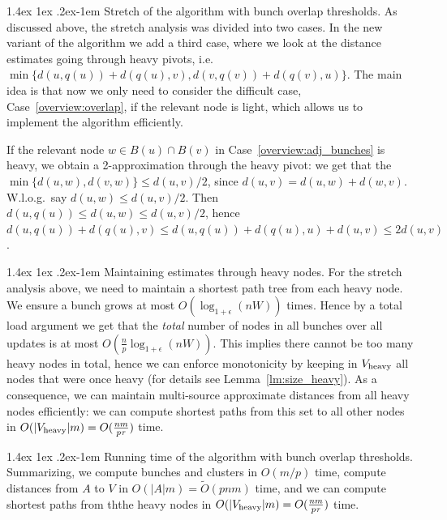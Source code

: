 \documentclass[11pt]{article}
\makeatletter
\theoremstyle{definition}
\theoremstyle{remark}
\renewcommand{\paragraph}{%
  \@startsection{paragraph}{4}%
  {\z@}{1.4ex \@plus 1ex \@minus .2ex}{-1em}%
  {\normalfont\normalsize\bfseries}%
}
\makeatother
\begin{document}
\begin{titlepage}
\paragraph{Stretch of the algorithm with bunch overlap thresholds.} As discussed above, the stretch analysis was divided into two cases. In the new variant of the algorithm we add a third case, where we look at the distance estimates going through heavy pivots, i.e.~$\min \{ d(u,q(u))+d(q(u),v), d(v,q(v))+d(q(v),u)\}$. The main idea is that now we only need to consider the difficult case, Case~\ref{overview:overlap}, if the relevant node is light, which allows us to implement the algorithm efficiently. 

If the relevant node $w\in B(u)\cap B(v)$ in Case~\ref{overview:adj_bunches} is heavy, we obtain a 2-approximation through the heavy pivot: we get that the $\min\{d(u,w),d(v,w)\} \leq d(u,v)/2$, since $d(u,v)= d(u,w)+d(w,v)$. W.l.o.g.\ say $d(u,w)\leq d(u,v)/2$. Then $d(u,q(u))\leq d(u,w)\leq d(u,v)/2$, hence $d(u,q(u))+d(q(u),v)\leq d(u,q(u))+d(q(u),u)+d(u,v) \leq 2d(u,v)$. 

\paragraph{Maintaining estimates through heavy nodes.}
For the stretch analysis above, we need to maintain a shortest path tree from each heavy node. We ensure a bunch grows at most $O(\log_{1+\epsilon}(nW))$ times. Hence by a total load argument we get that the \emph{total} number of nodes in all bunches over all updates is at most $O(\tfrac{n}{p}\log_{1+\epsilon}(nW))$. This implies there cannot be too many heavy nodes in total, hence we can enforce monotonicity by keeping in $V_{\rm{heavy}}$ all nodes that were once heavy (for details see Lemma~\ref{lm:size_heavy}). As a consequence, we can maintain multi-source approximate distances from all heavy nodes efficiently: we can compute shortest paths from this set to all other nodes in $O(|V_{\rm{heavy}}|m)=O(\tfrac{nm}{p\tau})$ time.


\paragraph{Running time of the algorithm with bunch overlap thresholds.}
Summarizing, we compute bunches and clusters in $O(m/p)$ time, compute distances from $A$ to $V$ in $O(|A|m)=\tilde O(pnm)$ time, and we can compute shortest paths from ththe heavy nodes in $O(|V_{\rm{heavy}}|m)=O(\tfrac{nm}{p\tau})$ time.



\end{titlepage}
\end{document}

